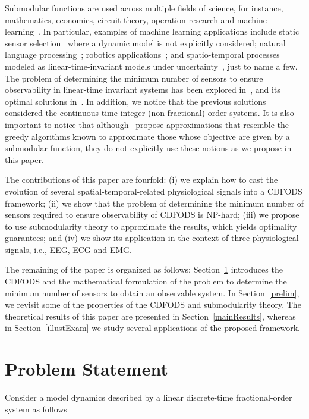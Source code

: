 Submodular functions are used across multiple fields of science, for instance, mathematics, economics,  circuit theory, operation research and machine learning~\cite{BachSurvey,Edmonds,Lovasz1983,Schrijver}. In particular, examples of machine learning applications include static sensor selection~\cite{KrauseGuestrinInfoGather,KrauseGuestrinSensorPlace} where a dynamic model is not explicitly considered; natural language processing~\cite{kirchhoff}; robotics applications~\cite{atanasov2015a,MeliouKGH07}; and  spatio-temporal processes modeled as linear-time-invariant models under uncertainty~\cite{aiStats}, just to name a few.  The problem of determining the minimum number of sensors to ensure observability in linear-time invariant systems has been explored in~\cite{MinControlProb}, and its optimal solutions in~\cite{PequitoJ4}. In addition, we notice that the previous solutions~\cite{MinControlProb,PequitoJ4} considered the continuous-time integer (non-fractional) order systems. It is also important to notice that although~\cite{MinControlProb,PequitoJ4} propose approximations that resemble the greedy algorithms known to approximate those whose objective are given by a submodular function,  they do not explicitly use these notions as we propose in this paper. 

The contributions of this paper are fourfold: (i) we explain how to cast the evolution of several spatial-temporal-related physiological signals into a CDFODS framework; (ii) we show that the problem of determining the minimum number of sensors required to ensure observability of CDFODS is NP-hard; (iii) we propose to use submodularity theory to approximate the results, which yields optimality guarantees; and  (iv) we show its application in the context of three physiological signals, i.e., EEG, ECG and EMG.

The remaining of the paper is organized as follows: Section~\ref{probStat} introduces the CDFODS and the mathematical formulation of the problem to determine the minimum number of sensors to obtain an observable system. In Section~\ref{prelim}, we revisit some of the properties of the CDFODS and submodularity theory. The theoretical  results of this paper are presented in Section~\ref{mainResults}, whereas in Section~\ref{illustExam} we study several applications of the proposed framework.


\section{Problem Statement}\label{probStat}
Consider a model dynamics described by a linear discrete-time fractional-order system as follows


